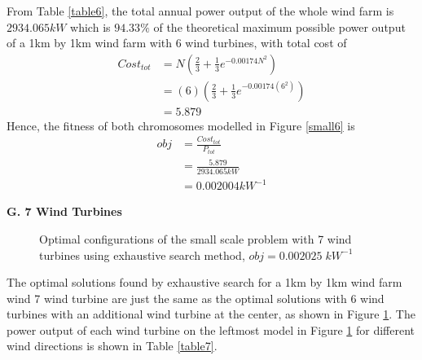         From Table \ref{table6}, the total annual power output of the whole wind farm is $2934.065kW$ which is $94.33\%$ of the theoretical maximum possible power output of a 1km by 1km wind farm with 6 wind turbines, with total cost of
        \begin{align*}
            Cost_{tot}
            &= N\left(\frac{2}{3} + \frac{1}{3}e^{-0.00174N^2}\right) \\
            &= \left(6\right)\left(\frac{2}{3} + \frac{1}{3}e^{-0.00174\left(6^2\right)}\right) \\
            &= 5.879
        \end{align*}
        Hence, the fitness of both chromosomes modelled in Figure \ref{small6} is
        \begin{align*}
            obj
            &=\frac{Cost_{tot}}{P_{tot}} \\
            &=\frac{5.879}{2934.065kW} \\
            &=0.002004kW^{-1}
        \end{align*}
        
    \textbf{G. 7 Wind Turbines}
        \begin{figure}[H]
            \centering
            \qquad
            \caption{Optimal configurations of the small scale problem with 7 wind turbines using exhaustive search method, $obj=0.002025\;kW^{-1}$}
            \label{small7}
        \end{figure}
        
        The optimal solutions found by exhaustive search for a 1km by 1km wind farm wind 7 wind turbine are just the same as the optimal solutions with 6 wind turbines with an additional wind turbine at the center, as shown in Figure \ref{small7}. The power output of each wind turbine on the leftmost model in Figure \ref{small7} for different wind directions is shown in Table \ref{table7}.
        
